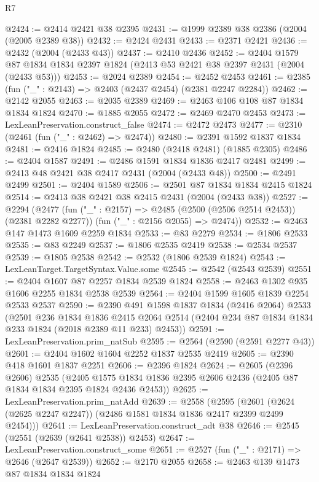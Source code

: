 \begin{lexlean}{R7}
\begin{coremodule}
@2424 := @2414 @2421 @38 @2395
@2431 := @1999 @2389 @38 @2386 (@2004 (@2005 @2389 @38))
@2432 := @2424 @2431
@2433 := @2371 @2421
@2436 := @2432 (@2004 (@2433 @43))
@2437 := @2410 @2436
@2452 := @2404
    @1579
    @87
    @1834
    @1834
    @2397
    @1824
    (@2413 @53 @2421 @38 @2397 @2431 (@2004 (@2433 @53)))
@2453 := @2024 @2389
@2454 := @2452 @2453
@2461 := @2385 (fun ("_" : @2143) => @2403 (@2437 @2454) (@2381 @2247 @2284))
@2462 := @2142 @2055
@2463 := @2035 @2389
@2469 := @2463 @106 @108 @87 @1834 @1834 @1824
@2470 := @1885 @2055
@2472 := @2469 @2470 @2453
@2473 := LexLeanPreservation.construct_false
@2474 := @2472 @2473
@2477 := @2310 (@2461 (fun ("_" : @2462) => @2474))
@2480 := @2391 @1592 @1837 @1834
@2481 := @2416 @1824
@2485 := @2480 (@2418 @2481) (@1885 @2305)
@2486 := @2404 @1587
@2491 := @2486 @1591 @1834 @1836 @2417 @2481
@2499 := @2413 @48 @2421 @38 @2417 @2431 (@2004 (@2433 @48))
@2500 := @2491 @2499
@2501 := @2404 @1589
@2506 := @2501 @87 @1834 @1834 @2415 @1824
@2514 := @2413 @38 @2421 @38 @2415 @2431 (@2004 (@2433 @38))
@2527 := @2294
    (@2477
      (fun ("_" : @2157) => @2485 (@2500 (@2506 @2514 @2453)) (@2381 @2282 @2277))
      (fun ("_" : @2156 @2055) => @2474))
@2532 := @2463 @147 @1473 @1609 @2259 @1834
@2533 := @83 @2279
@2534 := @1806 @2533
@2535 := @83 @2249
@2537 := @1806 @2535 @2419
@2538 := @2534 @2537
@2539 := @1805 @2538
@2542 := @2532 (@1806 @2539 @1824)
@2543 := LexLeanTarget.TargetSyntax.Value.some
@2545 := @2542 (@2543 @2539)
@2551 := @2404 @1607 @87 @2257 @1834 @2539 @1824
@2558 := @2463 @1302 @935 @1606 @2255 @1834 @2538 @2539
@2564 := @2404 @1599 @1605 @1839 @2254 @2533 @2537
@2590 := @2390
    @491
    @1598
    @1837
    @1834
    (@2416 @2064)
    @2533
    (@2501
      @236
      @1834
      @1836
      @2415
      @2064
      @2514
      (@2404 @234 @87 @1834 @1834 @233 @1824 (@2018 @2389 @11 @233) @2453))
@2591 := LexLeanPreservation.prim_natSub
@2595 := @2564 (@2590 (@2591 @2277 @43))
@2601 := @2404 @1602 @1604 @2252 @1837 @2535 @2419
@2605 := @2390 @418 @1601 @1837 @2251
@2606 := @2396 @1824
@2624 := @2605
    (@2396 @2606)
    @2535
    (@2405 @1575 @1834 @1836 @2395 @2606 @2436 (@2405 @87 @1834 @1834 @2395 @1824 @2436 @2453))
@2625 := LexLeanPreservation.prim_natAdd
@2639 := @2558
    (@2595 (@2601 (@2624 (@2625 @2247 @2247)) (@2486 @1581 @1834 @1836 @2417 @2399 @2499 @2454)))
@2641 := LexLeanPreservation.construct_adt @38
@2646 := @2545 (@2551 (@2639 (@2641 @2538)) @2453)
@2647 := LexLeanPreservation.construct_some
@2651 := @2527 (fun ("_" : @2171) => @2646 (@2647 @2539))
@2652 := @2170 @2055
@2658 := @2463 @139 @1473 @87 @1834 @1834 @1824

\end{coremodule}
\end{lexlean}
